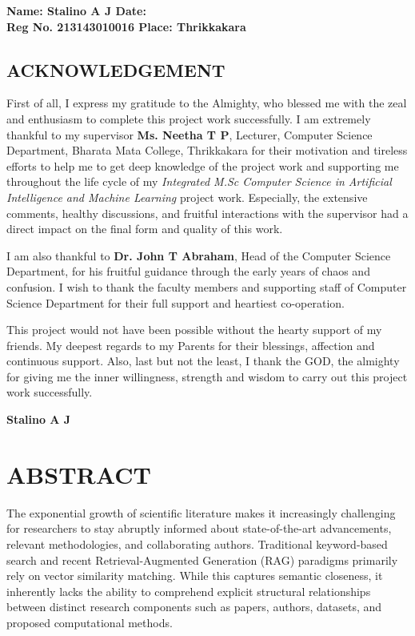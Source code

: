 \documentclass[12pt,a4paper]{report}
\begin{document}
\vspace{50pt}
\begin{flushright}
	\textbf{Name: Stalino A J \hfill Date: \underline{\hspace{2.8cm}}}  \\
	\textbf{Reg No. 213143010016 \hfill Place: Thrikkakara}
\end{flushright}

\clearpage

\begin{center}
	\section*{ACKNOWLEDGEMENT}
	\noindent{\rule{\textwidth}{1.5pt}}
\end{center}
First of all, I express my gratitude to the Almighty, who blessed me with the zeal and enthusiasm to complete this project work successfully. I am extremely thankful to my supervisor \textbf{Ms. Neetha T P}, Lecturer, Computer Science Department, Bharata Mata College, Thrikkakara for their motivation and tireless efforts to help me to get deep knowledge of the project work and supporting me throughout the life cycle of my \textit{Integrated M.Sc Computer Science in Artificial Intelligence and Machine Learning} project work. Especially, the extensive comments, healthy discussions, and fruitful interactions with the supervisor had a direct impact on the final form and quality of this work.

I am also thankful to \textbf{Dr. John T Abraham}, Head of the Computer Science Department, for his fruitful guidance through the early years of chaos and confusion. I wish to thank the faculty members and supporting staff of Computer Science Department for their full support and heartiest co-operation.	

This project would not have been possible without the hearty support of my friends. My deepest regards to my Parents for their blessings, affection and continuous support. Also, last but not the least, I thank the GOD, the almighty for giving me the inner willingness, strength and wisdom to carry out this project work successfully.
\begin{flushright}
	\textbf{Stalino A J}
\end{flushright}

\clearpage

\section*{ABSTRACT}
\noindent{\rule{\textwidth}{1.5pt}}
The exponential growth of scientific literature makes it increasingly challenging for researchers to stay abruptly informed about state-of-the-art advancements, relevant methodologies, and collaborating authors. Traditional keyword-based search and recent Retrieval-Augmented Generation (RAG) paradigms primarily rely on vector similarity matching. While this captures semantic closeness, it inherently lacks the ability to comprehend explicit structural relationships between distinct research components such as papers, authors, datasets, and proposed computational methods.
\end{document}
